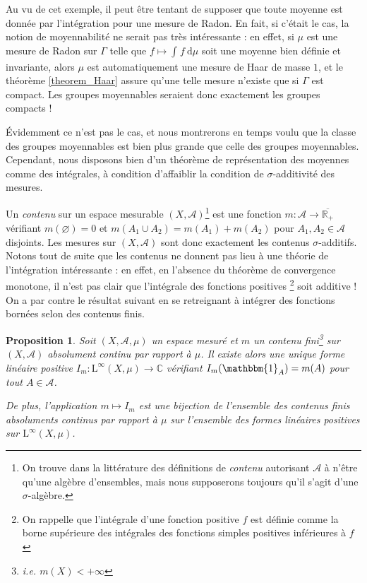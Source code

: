 \documentclass[a4paper,12pt]{article}
\newtheorem{proposition}[theorem]{Proposition}
\newcommand{\R}{\mathbb{R}}
\newcommand{\C}{\mathbb{C}}
\newcommand{\indic}{\mathbbm{1}}
\newcommand{\integral}[4]{\int_{#1}^{#2} #3~\mathrm{d}#4}
\newcommand{\closure}[1]{\overline{#1}}
\begin{document}
Au vu de cet exemple, il peut être tentant de supposer que toute moyenne est donnée par l'intégration pour une mesure 
de Radon. En fait, si c'était le cas, la notion de moyennabilité ne serait pas très intéressante :
en effet, si $\mu$ est une mesure de Radon sur $\Gamma$ telle que $f\mapsto\integral{}{}{f}{\mu}$ soit une moyenne bien définie et invariante,
alors $\mu$ est automatiquement une mesure de Haar de masse $1$, et le théorème \ref{theorem_Haar} assure qu'une telle mesure n'existe que si
$\Gamma$ est compact. Les groupes moyennables seraient donc exactement les groupes compacts !

Évidemment ce n'est pas le cas, et nous montrerons en temps voulu que la classe des groupes moyennables est bien plus grande que 
celle des groupes moyennables. Cependant, nous disposons bien d'un théorème de représentation des moyennes comme des
\og{}intégrales\fg{}, à condition d'affaiblir la condition de $\sigma$-additivité des mesures.

Un \emph{contenu} sur un espace mesurable $(X, \mathcal{A})$\footnote{On trouve dans la littérature des définitions de \emph{contenu} autorisant $\mathcal{A}$ à n'être qu'une algèbre d'ensembles,
mais nous supposerons toujours qu'il s'agit d'une $\sigma$-algèbre.} est une fonction $m:\mathcal{A}\to\closure{\R_+}$ vérifiant $m(\varnothing) = 0$
et $m(A_1\cup A_2) = m(A_1) + m(A_2)$ pour $A_1, A_2\in\mathcal{A}$ disjoints. Les mesures sur $(X, \mathcal{A})$
sont donc exactement les contenus $\sigma$-additifs. Notons tout de suite que les contenus ne donnent pas lieu à 
une théorie de l'intégration intéressante : en effet, en l'absence du théorème de convergence monotone, il n'est pas clair que l'intégrale 
des fonctions positives \footnote{On rappelle que l'intégrale d'une fonction positive $f$ est définie comme la borne supérieure des 
intégrales des fonctions simples positives inférieures à $f$} soit additive ! On a par contre le résultat suivant en se retreignant à
intégrer des fonctions bornées selon des contenus finis.

\begin{proposition}\label{content_integration_and_repr}
    Soit $(X, \mathcal{A}, \mu)$ un espace mesuré et $m$ un contenu fini\footnote{i.e. $m(X)<+\infty$} sur $(X, \mathcal{A})$ \emph{absolument continu par rapport
    à} $\mu$. Il existe alors une unique forme linéaire positive $I_m : \mathrm{L}^\infty(X, \mu)\to\C$ vérifiant $I_m(\indic_A) = m(A)$ pour tout
    $A\in\mathcal{A}$. 

    De plus, l'application $m\mapsto I_m$ est une bijection de l'ensemble des contenus finis absoluments continus par rapport à $\mu$
    sur l'ensemble des formes linéaires positives sur $\mathrm{L}^\infty(X, \mu)$.
\end{proposition}
\end{document}
